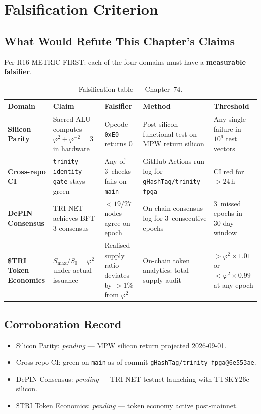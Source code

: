 \section{Falsification Criterion}
\label{sec:flos74-falsify}

\subsection{What Would Refute This Chapter's Claims}

Per R16 METRIC-FIRST: each of the four domains must have a \textbf{measurable
falsifier}.

\begin{table}[h]
\centering
\caption{Falsification table — Chapter~74.}
\label{tab:falsification}
\begin{tabular}{p{2cm}p{3cm}p{2.5cm}p{3cm}p{2cm}}
\hline
Domain & Claim & Falsifier & Method & Threshold \\
\hline
\textbf{Silicon Parity} &
Sacred ALU computes \(\varphi^2+\varphi^{-2}=3\) in hardware &
Opcode \texttt{0xE0} returns 0 &
Post-silicon functional test on MPW return silicon &
Any single failure in \(10^6\) test vectors \\
\hline
\textbf{Cross-repo CI} &
\texttt{trinity-identity-gate} stays green &
Any of 3~checks fails on \texttt{main} &
GitHub Actions run log for \texttt{gHashTag/trinity-fpga} &
CI red for \(> 24\,\text{h}\) \\
\hline
\textbf{DePIN Consensus} &
TRI NET achieves BFT-3 consensus &
\(< 19/27\) nodes agree on epoch &
On-chain consensus log for 3~consecutive epochs &
3~missed epochs in 30-day window \\
\hline
\textbf{\$TRI Token Economics} &
\(S_{\max}/S_0 = \varphi^2\) under actual issuance &
Realised supply ratio deviates by \(> 1\%\) from \(\varphi^2\) &
On-chain token analytics: total supply audit &
\(> \varphi^2 \times 1.01\) or \(< \varphi^2 \times 0.99\) at any epoch \\
\hline
\end{tabular}
\end{table}

\subsection{Corroboration Record}

\begin{itemize}
  \item Silicon Parity: \textit{pending} — MPW silicon return projected
        2026-09-01.
  \item Cross-repo CI: green on \texttt{main} as of commit
        \texttt{gHashTag/trinity-fpga@6e553ae}.
  \item DePIN Consensus: \textit{pending} — TRI NET testnet launching with
        TTSKY26c silicon.
  \item \$TRI Token Economics: \textit{pending} — token economy
        active post-mainnet.
\end{itemize}

